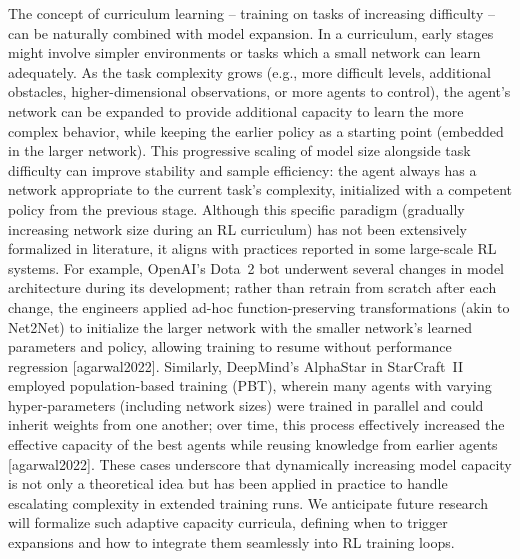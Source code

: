 The concept of curriculum learning – training on tasks of increasing difficulty – can be naturally combined with model expansion. In a curriculum, early stages might involve simpler environments or tasks which a small network can learn adequately. As the task complexity grows (e.g., more difficult levels, additional obstacles, higher-dimensional observations, or more agents to control), the agent’s network can be expanded to provide additional capacity to learn the more complex behavior, while keeping the earlier policy as a starting point (embedded in the larger network). This progressive scaling of model size alongside task difficulty can improve stability and sample efficiency: the agent always has a network appropriate to the current task’s complexity, initialized with a competent policy from the previous stage. Although this specific paradigm (gradually increasing network size during an RL curriculum) has not been extensively formalized in literature, it aligns with practices reported in some large-scale RL systems. For example, OpenAI’s Dota 2 bot underwent several changes in model architecture during its development; rather than retrain from scratch after each change, the engineers applied ad-hoc function-preserving transformations (akin to Net2Net) to initialize the larger network with the smaller network’s learned parameters and policy, allowing training to resume without performance regression [agarwal2022]. Similarly, DeepMind’s AlphaStar in StarCraft II employed population-based training (PBT), wherein many agents with varying hyper-parameters (including network sizes) were trained in parallel and could inherit weights from one another; over time, this process effectively increased the effective capacity of the best agents while reusing knowledge from earlier agents [agarwal2022]. These cases underscore that dynamically increasing model capacity is not only a theoretical idea but has been applied in practice to handle escalating complexity in extended training runs. We anticipate future research will formalize such adaptive capacity curricula, defining when to trigger expansions and how to integrate them seamlessly into RL training loops.

